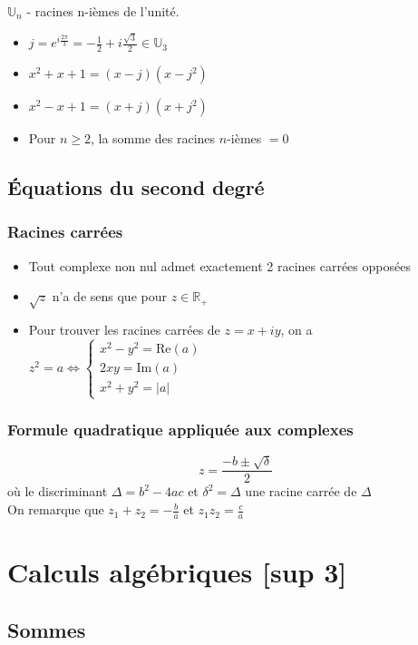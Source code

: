 \documentclass[openany]{book}
\begin{document}
\noindent $\mathbb{U}_n$ - racines n-ièmes de l'unité. 
\begin{itemize}
    \item $j=e^{i\frac{2\pi}{3}} = -\frac{1}{2} + i \frac{\sqrt{3}}{2} \in \mathbb{U}_3$
    \item $x^2 + x + 1 = (x - j)(x - j^2)$
    \item $x^2 - x + 1 = (x + j)(x + j^2)$
    \item Pour $n\geq2$, la somme des racines $n$-ièmes $=0$
\end{itemize}

\subsection{Équations du second degré}
\subsubsection{Racines carrées}
\begin{itemize}
    \item Tout complexe non nul admet exactement 2 racines carrées opposées
    \item $\sqrt{z}$ n'a de sens que pour $z\in\mathbb{R}_+$
    \item \noindent Pour trouver les racines carrées de $z=x+iy$, on a $z^2=a \iff 
    \begin{cases} 
        x^2-y^2=\text{Re}(a) \\
        2xy = \text{Im}(a) \\
        x^2+y^2 = |a|
    \end{cases}$
\end{itemize}

\subsubsection{Formule quadratique appliquée aux complexes}
\[z=\frac{-b\pm\sqrt \delta}{2}\]
\noindent où le discriminant $ \Delta = b^2-4ac $ et $ \delta^2 = \Delta $ une racine carrée de $ \Delta $ \\

\noindent On remarque que $ z_1 + z_2 = -\frac{b}{a} $ et $ z_1z_2 = \frac{c}{a} $

\clearpage
\section{Calculs algébriques [sup 3]}
\subsection{Sommes}
\end{document}
